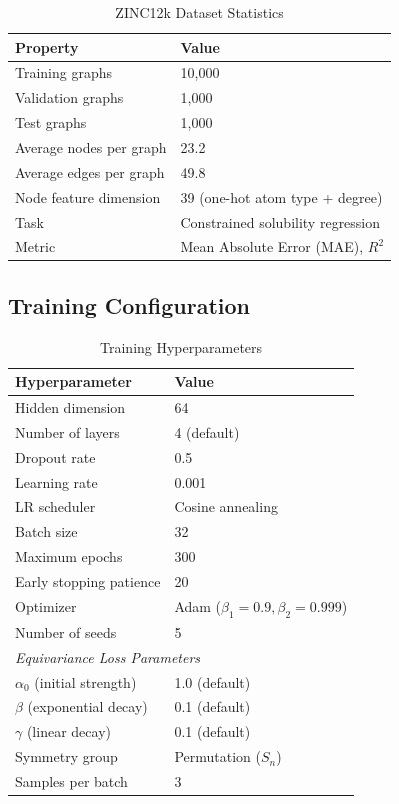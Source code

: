 \documentclass[11pt,a4paper]{article}
\begin{document}
\begin{table}[H]
\centering
\caption{ZINC12k Dataset Statistics}
\label{tab:zinc_stats}
\begin{tabular}{ll}
\toprule
\textbf{Property} & \textbf{Value} \\
\midrule
Training graphs & 10,000 \\
Validation graphs & 1,000 \\
Test graphs & 1,000 \\
Average nodes per graph & 23.2 \\
Average edges per graph & 49.8 \\
Node feature dimension & 39 (one-hot atom type + degree) \\
Task & Constrained solubility regression \\
Metric & Mean Absolute Error (MAE), $R^2$ \\
\bottomrule
\end{tabular}
\end{table}

\subsection{Training Configuration}

\begin{table}[H]
\centering
\caption{Training Hyperparameters}
\label{tab:hyperparams}
\begin{tabular}{ll}
\toprule
\textbf{Hyperparameter} & \textbf{Value} \\
\midrule
Hidden dimension & 64 \\
Number of layers & 4 (default) \\
Dropout rate & 0.5 \\
Learning rate & 0.001 \\
LR scheduler & Cosine annealing \\
Batch size & 32 \\
Maximum epochs & 300 \\
Early stopping patience & 20 \\
Optimizer & Adam ($\beta_1=0.9, \beta_2=0.999$) \\
Number of seeds & 5 \\
\midrule
\multicolumn{2}{l}{\textit{Equivariance Loss Parameters}} \\
$\alpha_0$ (initial strength) & 1.0 (default) \\
$\beta$ (exponential decay) & 0.1 (default) \\
$\gamma$ (linear decay) & 0.1 (default) \\
Symmetry group & Permutation ($S_n$) \\
Samples per batch & 3 \\
\bottomrule
\end{tabular}
\end{table}
\end{document}
